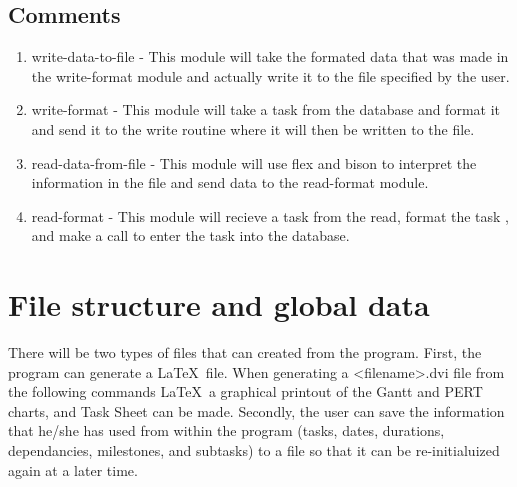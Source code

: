         \subsection{Comments}
        \begin{enumerate}
        \item write-data-to-file - This module will take the formated data
that was made in the write-format module and actually write it to the file
specified by the user.
        \item write-format - This module will take a task from the database and
format it and send it to the write routine where it will then be written to the
file.
        \item read-data-from-file - This module will use flex and bison to
interpret the information in the file and send data to the read-format module.
        \item read-format - This module will recieve a task from the read,
format the task , and make a call to enter the task into the database.
        \end{enumerate}


%
%
\section{File structure and global data}
There will be two types of files that can created from the program. First, the
program can generate a \LaTeX\ file. When generating a <filename>.dvi file from
the following commands \LaTeX\ a graphical printout of the Gantt and PERT
charts, and Task Sheet can be made. Secondly, the user can save the information
that he/she has used from within the program (tasks, dates, durations,
dependancies, milestones, and subtasks) to a file so that it can be
re-initialuized again at a later time.






%
